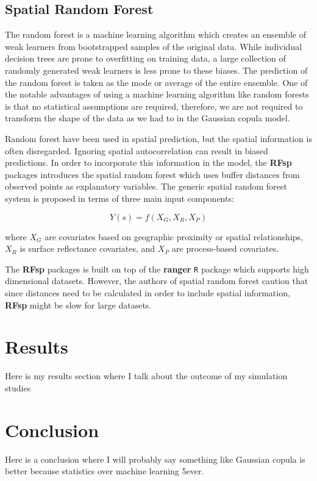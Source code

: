 \documentclass{article}
\begin{document}
\subsection{Spatial Random Forest}
The random forest is a machine learning algorithm which creates an ensemble of weak learners from bootstrapped samples of the original data\cite{breiman01}.
While individual decision trees are prone to overfitting on training data, a large collection of randomly generated weak learners is less prone to these biases.
The prediction of the random forest is taken as the mode or average of the entire ensemble.
One of the notable advantages of using a machine learning algorithm like random forests is that no statistical assumptions are required, therefore, we are not required to transform the shape of the data as we had to in the Gaussian copula model.

Random forest have been used in spatial prediction, but the spatial information is often disregarded\cite{hengl18}.
Ignoring spatial autocorrelation can result in biased predictions.
In order to incorporate this information in the model, the \textbf{RFsp} packages introduces the spatial random forest which uses buffer distances from observed points as explanatory variables.
The generic spatial random forest system is proposed in terms of three main input components:

$$
Y(s) = f(X_G, X_R, X_P)
$$

where $X_G$ are covariates based on geographic proximity or spatial relationships, $X_R$ is surface reflectance covariates, and $X_P$ are process-based covariates.

The \textbf{RFsp} packages is built on top of the \textbf{ranger} \texttt{R} package which supports high dimensional datasets.
However, the authors of spatial random forest caution that since distances need to be calculated in order to include spatial information, \textbf{RFsp} might be slow for large datasets.

\section{Results}
Here is my results section where I talk about the outcome of my simulation studies

\section{Conclusion}
Here is a conclusion where I will probably say something like Gaussian copula is better because statistics over machine learning 5ever.

\printbibliography
\end{document}
